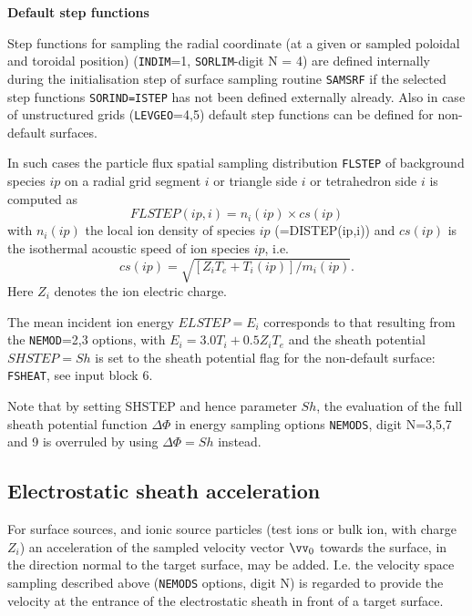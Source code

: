 \textbf{Default step functions}

Step functions for sampling the radial coordinate (at a given or sampled  poloidal and toroidal position)
(\texttt{INDIM}=1, \texttt{SORLIM}-digit N = 4) are defined internally during the initialisation step of surface sampling routine \texttt{SAMSRF} if the selected step functions
\texttt{SORIND=ISTEP} has not been defined externally already.
Also in case of unstructured grids (\texttt{LEVGEO}=4,5) default step functions can be defined for non-default surfaces.


In such cases the particle flux  spatial sampling distribution \texttt{FLSTEP} of background species $ip$ on a radial grid segment $i$ or triangle side $i$ or tetrahedron side $i$ is computed as
\begin{equation}
FLSTEP(ip,i)=n_i(ip) \times cs(ip)
\end{equation}
with $n_i(ip)$ the local ion density of species $ip$ (=DISTEP(ip,i)) and $cs(ip)$ is the isothermal acoustic speed of ion species
$ip$, i.e.
\begin{equation}
cs(ip)=\sqrt{[Z_i T_e+T_i(ip)]/m_i(ip)}.
\end{equation}
Here $Z_i$ denotes the ion electric charge.

The mean incident ion energy $ELSTEP=E_i$ corresponds to that resulting from the \texttt{NEMOD}=2,3 options,
with $E_i=3.0 T_i + 0.5 Z_i T_e$ and the sheath potential $SHSTEP= Sh$ is set to the sheath potential flag for the non-default surface: \texttt{FSHEAT}, see input block 6.

Note that by setting SHSTEP and hence parameter $Sh$, the evaluation of the full sheath potential function $\Delta \Phi$
in energy sampling options \texttt{NEMODS}, digit N=3,5,7 and 9 is overruled by using $\Delta \Phi = Sh$ instead.


\subsection{Electrostatic sheath acceleration}
\label{sec2.7.2}

For surface sources, and ionic source particles (test ions or bulk ion, with charge $Z_i$) an acceleration of the
sampled velocity vector $\vv_0$ towards the surface, in the direction normal to the target surface, may be added.
I.e. the velocity space sampling described above (\texttt{NEMODS} options, digit N) is regarded to provide the velocity at the entrance
of the electrostatic sheath in front of a target surface.

